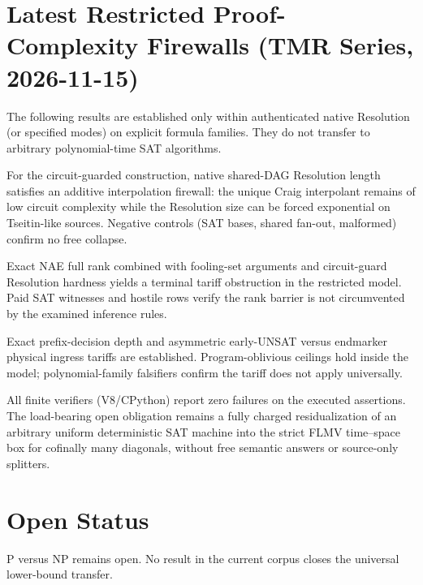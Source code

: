 
\section{Latest Restricted Proof-Complexity Firewalls (TMR Series, 2026-11-15)}

The following results are established only within authenticated native Resolution (or specified modes) on explicit formula families. They do not transfer to arbitrary polynomial-time SAT algorithms.

\begin{theorem}
For the circuit-guarded construction, native shared-DAG Resolution length satisfies an additive interpolation firewall: the unique Craig interpolant remains of low circuit complexity while the Resolution size can be forced exponential on Tseitin-like sources. Negative controls (SAT bases, shared fan-out, malformed) confirm no free collapse.
\end{theorem}

\begin{theorem}
Exact NAE full rank combined with fooling-set arguments and circuit-guard Resolution hardness yields a terminal tariff obstruction in the restricted model. Paid SAT witnesses and hostile rows verify the rank barrier is not circumvented by the examined inference rules.
\end{theorem}

\begin{theorem}
Exact prefix-decision depth and asymmetric early-UNSAT versus endmarker physical ingress tariffs are established. Program-oblivious ceilings hold inside the model; polynomial-family falsifiers confirm the tariff does not apply universally.
\end{theorem}

\begin{remark}
All finite verifiers (V8/CPython) report zero failures on the executed assertions. The load-bearing open obligation remains a fully charged residualization of an arbitrary uniform deterministic SAT machine into the strict FLMV time–space box for cofinally many diagonals, without free semantic answers or source-only splitters.
\end{remark}

\section{Open Status}
P versus NP remains open. No result in the current corpus closes the universal lower-bound transfer.
